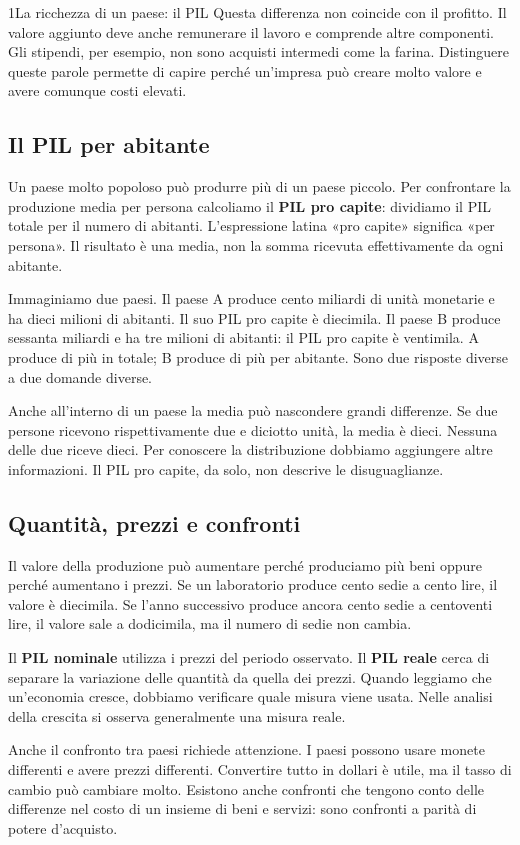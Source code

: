 \begin{lettura}{1}{La ricchezza di un paese: il PIL}
Questa differenza non coincide con il profitto. Il valore aggiunto deve anche remunerare il lavoro e comprende altre componenti. Gli stipendi, per esempio, non sono acquisti intermedi come la farina. Distinguere queste parole permette di capire perché un'impresa può creare molto valore e avere comunque costi elevati.

\subsection*{Il PIL per abitante}
Un paese molto popoloso può produrre più di un paese piccolo. Per confrontare la produzione media per persona calcoliamo il \textbf{PIL pro capite}: dividiamo il PIL totale per il numero di abitanti. L'espressione latina «pro capite» significa «per persona». Il risultato è una media, non la somma ricevuta effettivamente da ogni abitante.

Immaginiamo due paesi. Il paese A produce cento miliardi di unità monetarie e ha dieci milioni di abitanti. Il suo PIL pro capite è diecimila. Il paese B produce sessanta miliardi e ha tre milioni di abitanti: il PIL pro capite è ventimila. A produce di più in totale; B produce di più per abitante. Sono due risposte diverse a due domande diverse.

Anche all'interno di un paese la media può nascondere grandi differenze. Se due persone ricevono rispettivamente due e diciotto unità, la media è dieci. Nessuna delle due riceve dieci. Per conoscere la distribuzione dobbiamo aggiungere altre informazioni. Il PIL pro capite, da solo, non descrive le disuguaglianze.

\subsection*{Quantità, prezzi e confronti}
Il valore della produzione può aumentare perché produciamo più beni oppure perché aumentano i prezzi. Se un laboratorio produce cento sedie a cento lire, il valore è diecimila. Se l'anno successivo produce ancora cento sedie a centoventi lire, il valore sale a dodicimila, ma il numero di sedie non cambia.

Il \textbf{PIL nominale} utilizza i prezzi del periodo osservato. Il \textbf{PIL reale} cerca di separare la variazione delle quantità da quella dei prezzi. Quando leggiamo che un'economia cresce, dobbiamo verificare quale misura viene usata. Nelle analisi della crescita si osserva generalmente una misura reale.

Anche il confronto tra paesi richiede attenzione. I paesi possono usare monete differenti e avere prezzi differenti. Convertire tutto in dollari è utile, ma il tasso di cambio può cambiare molto. Esistono anche confronti che tengono conto delle differenze nel costo di un insieme di beni e servizi: sono confronti a parità di potere d'acquisto.


\end{lettura}
